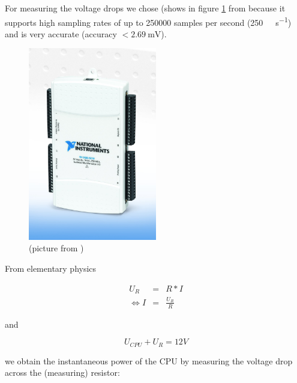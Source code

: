 \label{sec:measuring-device}

For measuring the voltage drops we chose \JWPni{} (shows in figure \ref{fig:ni}
from  because it supports
high sampling rates of up to 250000 samples per second
(\SI{250}{\kilo\samples\per\second}) and is very accurate
(accuracy $< \SI{2.69}{\milli\volt}$)\cite{NISpec2009}.

\begin{figure}
  \centering
    \includegraphics[width=0.5\textwidth]{fig/NI-USB-6218.jpg}
  \caption{\JWPni{} (picture from )}
  \label{fig:ni}
\end{figure}


\label{sec:calc-work}

From elementary physics

\begin{eqnarray}
     U_R & = & R * I \\
  \iff I & = & \frac{U_R}{R}
\end{eqnarray}

and

\begin{equation}
  U_{CPU} + U_{R} = 12 V
\end{equation}

we obtain the instantaneous power of the CPU by measuring the voltage drop
across the (measuring) resistor:


